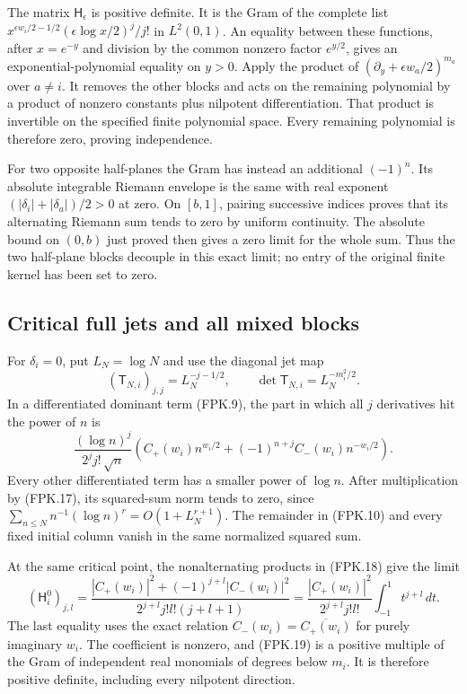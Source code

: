 The matrix $\mathsf H_\epsilon$ is positive definite. It is the
Gram of the complete list
$x^{\epsilon w_i/2-1/2}(\epsilon\log x/2)^j/j!$ in $L^2(0,1)$.
An equality between these functions, after $x=e^{-y}$ and division
by the common nonzero factor $e^{y/2}$, gives an
exponential-polynomial equality on $y>0$. Apply the product of
$(\partial_y+\epsilon w_a/2)^{m_a}$ over $a\ne i$.
It removes the other blocks and acts on the remaining polynomial
by a product of nonzero constants plus nilpotent differentiation.
That product is invertible on the specified finite polynomial space.
Every remaining polynomial is therefore zero, proving independence.

For two opposite half-planes the Gram has instead an additional
$(-1)^n$. Its absolute integrable Riemann envelope is the same
with real exponent $(|\delta_i|+|\delta_a|)/2>0$ at zero.
On $[b,1]$, pairing successive indices proves that its alternating
Riemann sum tends to zero by uniform continuity. The absolute
bound on $(0,b)$ just proved then gives a zero limit for the whole
sum. Thus the two half-plane blocks decouple in this exact limit;
no entry of the original finite kernel has been set to zero.

\subsection{Critical full jets and all mixed blocks}

For $\delta_i=0$, put $L_N=\log N$ and use the diagonal jet map
\[
 (\mathsf T_{N,i})_{j,j}=L_N^{-j-1/2},
 \qquad \det\mathsf T_{N,i}=L_N^{-m_i^2/2}.
 \tag{FPK.17}
\]
In a differentiated dominant term (FPK.9), the part in which all
$j$ derivatives hit the power of $n$ is
\[
 \frac{(\log n)^j}{2^j j!\,\sqrt n}
       \left(C_+(w_i)n^{w_i/2}
                    +(-1)^{n+j}C_-(w_i)n^{-w_i/2}\right).
 \tag{FPK.18}
\]
Every other differentiated term has a smaller power of $\log n$.
After multiplication by (FPK.17), its squared-sum norm tends to
zero, since $\sum_{n\leq N}n^{-1}(\log n)^r
 =O(1+L_N^{r+1})$. The remainder in (FPK.10) and every fixed
initial column vanish in the same normalized squared sum.

At the same critical point, the nonalternating products in (FPK.18)
give the limit
\[
 (\mathsf H_i^0)_{j,l}
 =\frac{|C_+(w_i)|^2+(-1)^{j+l}|C_-(w_i)|^2}
            {2^{j+l}j!l!(j+l+1)}
 =\frac{|C_+(w_i)|^2}{2^{j+l}j!l!}
                    \int_{-1}^1t^{j+l}\,dt.
 \tag{FPK.19}
\]
The last equality uses the exact relation
$C_-(w_i)=\overline{C_+(w_i)}$ for purely imaginary $w_i$.
The coefficient is nonzero, and (FPK.19) is a positive multiple
of the Gram of independent real monomials of degrees below $m_i$.
It is therefore positive definite, including every nilpotent direction.

